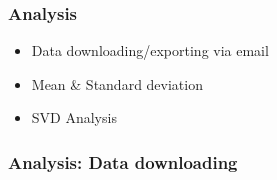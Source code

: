 \begin{frame}
\frametitle{Analysis}
\begin{itemize}
    \item Data downloading/exporting via email
    \item Mean \& Standard deviation
    \item SVD Analysis
\end{itemize}
\end{frame}


\begin{frame}
\frametitle{Analysis: Data downloading}

\end{frame}